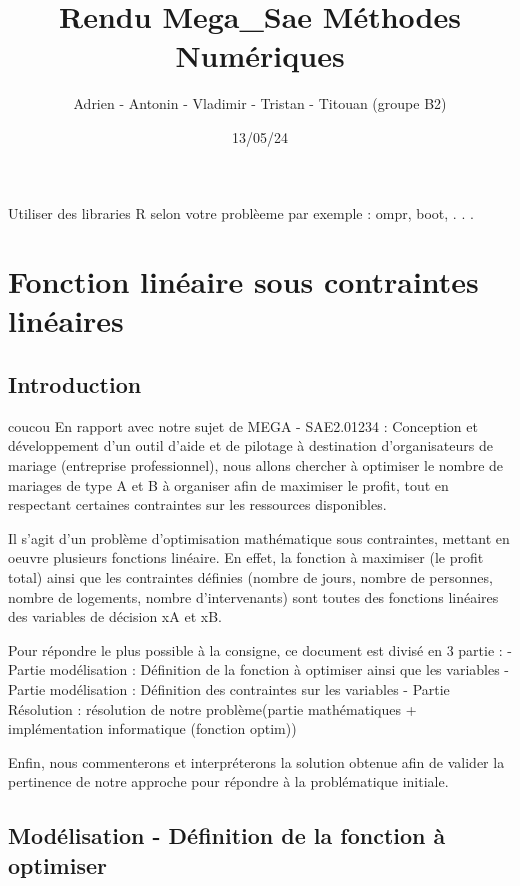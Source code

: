 \documentclass[
]{article}
\title{Rendu Mega\_Sae Méthodes Numériques}
\author{Adrien - Antonin - Vladimir - Tristan - Titouan (groupe B2)}
\date{13/05/24}
\begin{document}
\maketitle

Utiliser des libraries R selon votre problèeme par exemple : ompr, boot,
. . .

\section{Fonction linéaire sous contraintes
linéaires}\label{fonction-linuxe9aire-sous-contraintes-linuxe9aires}

\subsection{Introduction}\label{introduction}

coucou En rapport avec notre sujet de MEGA - SAE2.01234 : Conception et
développement d'un outil d'aide et de pilotage à destination
d'organisateurs de mariage (entreprise professionnel), nous allons
chercher à optimiser le nombre de mariages de type A et B à organiser
afin de maximiser le profit, tout en respectant certaines contraintes
sur les ressources disponibles.

Il s'agit d'un problème d'optimisation mathématique sous contraintes,
mettant en oeuvre plusieurs fonctions linéaire. En effet, la fonction à
maximiser (le profit total) ainsi que les contraintes définies (nombre
de jours, nombre de personnes, nombre de logements, nombre
d'intervenants) sont toutes des fonctions linéaires des variables de
décision xA et xB.

Pour répondre le plus possible à la consigne, ce document est divisé en
3 partie : - Partie modélisation : Définition de la fonction à optimiser
ainsi que les variables - Partie modélisation : Définition des
contraintes sur les variables - Partie Résolution : résolution de notre
problème(partie mathématiques + implémentation informatique (fonction
optim))

Enfin, nous commenterons et interpréterons la solution obtenue afin de
valider la pertinence de notre approche pour répondre à la problématique
initiale.

\subsection{Modélisation - Définition de la fonction à
optimiser}\label{moduxe9lisation---duxe9finition-de-la-fonction-uxe0-optimiser}
\end{document}
